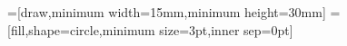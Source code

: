 \usepackage{tikz}

=[draw,minimum width=15mm,minimum height=30mm]
=[fill,shape=circle,minimum size=3pt,inner sep=0pt]
